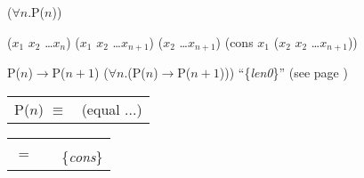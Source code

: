 ($\forall$$n$.P($n$))

($x_1$ $x_2$ \dots $x_n$)
($x_1$ $x_2$ \dots $x_{n+1}$)
($x_2$ \dots $x_{n+1}$)
(cons $x_1$ ($x_2$ $x_2$ \dots $x_{n+1}$))

P($n$)$\rightarrow$P($n+1$)
($\forall$$n$.(P($n$)$\rightarrow$P($n+1$)))
``\{\emph{len0}\}''
(see page \pageref{len-equations})

\begin{center}
\begin{tabular} {ll}
P($n$) $\equiv$  & (equal ...) \\
\end{tabular}
\end{center}

\begin{}
\end{}

\begin{center}
\begin{tabular}{lll}
    &   &                 \\
$=$ &   & \{\emph{cons}\} \\
\end{tabular}
\end{center}

\begin{lstlisting}
\end{lstlisting} 

\begin{ExerciseList}
\Exercise 
\end{ExerciseList}
